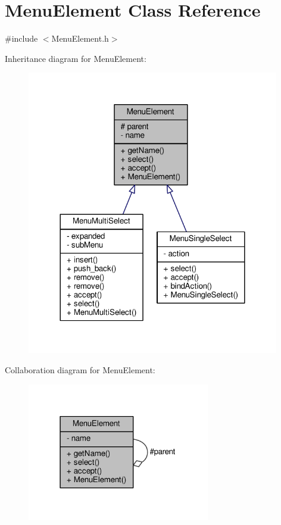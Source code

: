 \hypertarget{classMenuElement}{}\section{Menu\+Element Class Reference}
\label{classMenuElement}


{\ttfamily \#include $<$Menu\+Element.\+h$>$}



Inheritance diagram for Menu\+Element\+:
\nopagebreak
\begin{figure}[H]
\begin{center}
\leavevmode
\includegraphics[width=312pt]{classMenuElement__inherit__graph}
\end{center}
\end{figure}


Collaboration diagram for Menu\+Element\+:
\nopagebreak
\begin{figure}[H]
\begin{center}
\leavevmode
\includegraphics[width=226pt]{classMenuElement__coll__graph}
\end{center}
\end{figure}
